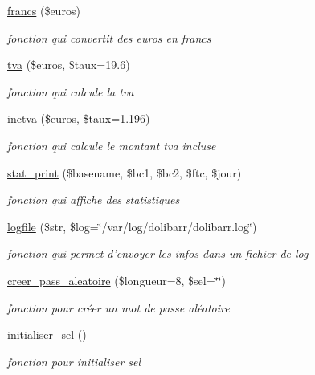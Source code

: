 \begin{CompactItemize}
\hyperlink{functions_8inc_8php_a39}{francs} (\$euros)
\begin{CompactList}\small\item\em fonction qui convertit des euros en francs \item\end{CompactList}\item 
\hyperlink{functions_8inc_8php_a40}{tva} (\$euros, \$taux=19.6)
\begin{CompactList}\small\item\em fonction qui calcule la tva \item\end{CompactList}\item 
\hyperlink{functions_8inc_8php_a41}{inctva} (\$euros, \$taux=1.196)
\begin{CompactList}\small\item\em fonction qui calcule le montant tva incluse \item\end{CompactList}\item 
\hyperlink{functions_8inc_8php_a42}{stat\_\-print} (\$basename, \$bc1, \$bc2, \$ftc, \$jour)
\begin{CompactList}\small\item\em fonction qui affiche des statistiques \item\end{CompactList}\item 
\hyperlink{functions_8inc_8php_a44}{logfile} (\$str, \$log=\char`\"{}/var/log/dolibarr/dolibarr.log\char`\"{})
\begin{CompactList}\small\item\em fonction qui permet d'envoyer les infos dans un fichier de log \item\end{CompactList}\item 
\hyperlink{functions_8inc_8php_a45}{creer\_\-pass\_\-aleatoire} (\$longueur=8, \$sel=\char`\"{}\char`\"{})
\begin{CompactList}\small\item\em fonction pour cr\'{e}er un mot de passe al\'{e}atoire \item\end{CompactList}\item 
\hyperlink{functions_8inc_8php_a46}{initialiser\_\-sel} ()
\begin{CompactList}\small\item\em fonction pour initialiser sel \item\end{CompactList}\end{CompactItemize}


